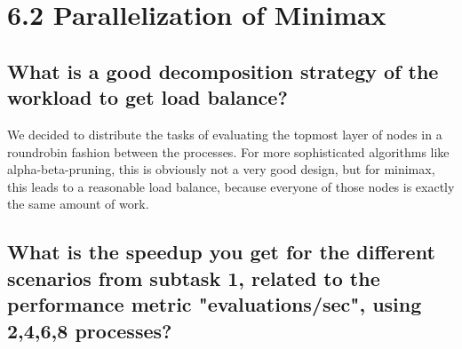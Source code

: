 \section*{6.2 Parallelization of Minimax}
\subsection*{What is a good decomposition strategy of the workload to get load balance?}
We decided to distribute the tasks of evaluating the topmost layer of nodes in a roundrobin fashion between the processes. For more sophisticated algorithms like alpha-beta-pruning, this is obviously not a very good design, but for minimax, this leads to a reasonable load balance, because everyone of those nodes is exactly the same amount of work.

\subsection*{What is the speedup you get for the different scenarios from subtask 1, related to the performance metric "evaluations/sec", using 2,4,6,8 processes?}


